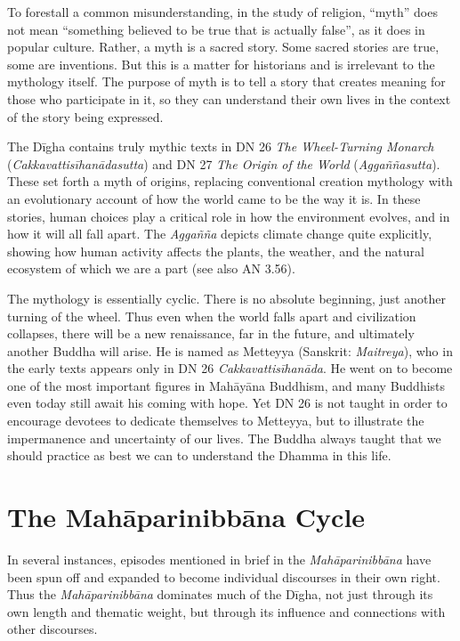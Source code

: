 \documentclass[12pt,openany]{book}%
\begin{document}
To forestall a common misunderstanding, in the study of religion, “myth” does not mean “something believed to be true that is actually false”, as it does in popular culture. Rather, a myth is a sacred story. Some sacred stories are true, some are inventions. But this is a matter for historians and is irrelevant to the mythology itself. The purpose of myth is to tell a story that creates meaning for those who participate in it, so they can understand their own lives in the context of the story being expressed.

The \textsanskrit{Dīgha} contains truly mythic texts in DN 26 \textit{The Wheel-Turning Monarch} (\textit{\textsanskrit{Cakkavattisīhanādasutta}}) and DN 27 \textit{The Origin of the World} (\textit{\textsanskrit{Aggaññasutta}}). These set forth a myth of origins, replacing conventional creation mythology with an evolutionary account of how the world came to be the way it is. In these stories, human choices play a critical role in how the environment evolves, and in how it will all fall apart. The \textit{\textsanskrit{Aggañña}} depicts climate change quite explicitly, showing how human activity affects the plants, the weather, and the natural ecosystem of which we are a part (see also AN 3.56).

The mythology is essentially cyclic. There is no absolute beginning, just another turning of the wheel. Thus even when the world falls apart and civilization collapses, there will be a new renaissance, far in the future, and ultimately another Buddha will arise. He is named as Metteyya (Sanskrit: \textit{Maitreya}), who in the early texts appears only in DN 26 \textit{\textsanskrit{Cakkavattisīhanāda}}. He went on to become one of the most important figures in \textsanskrit{Mahāyāna} Buddhism, and many Buddhists even today still await his coming with hope. Yet DN 26 is not taught in order to encourage devotees to dedicate themselves to Metteyya, but to illustrate the impermanence and uncertainty of our lives. The Buddha always taught that we should practice as best we can to understand the Dhamma in this life.

\section*{The \textsanskrit{Mahāparinibbāna} Cycle}

In several instances, episodes mentioned in brief in the \textit{\textsanskrit{Mahāparinibbāna}} have been spun off and expanded to become individual discourses in their own right. Thus the \textit{\textsanskrit{Mahāparinibbāna}} dominates much of the \textsanskrit{Dīgha}, not just through its own length and thematic weight, but through its influence and connections with other discourses.
\end{document}
